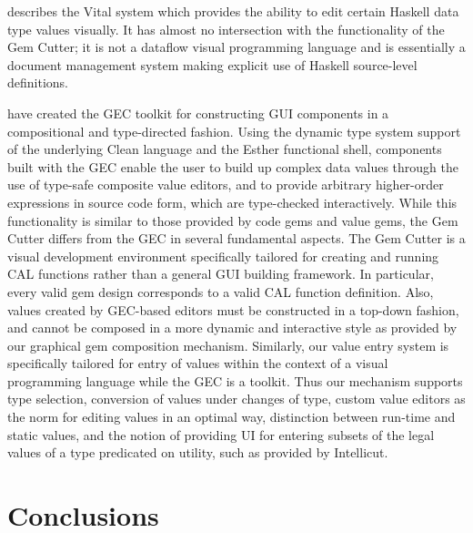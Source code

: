 \documentclass[preprint]{sigplanconf}
\begin{document}
\citet{hanna02} describes the Vital system which provides the ability to edit certain
Haskell data type values visually. It has almost no intersection with
the functionality of the Gem Cutter; it is not a dataflow visual
programming language and is essentially a document management system making
explicit use of Haskell source-level definitions.

\citet{achten-afp04} have
created the GEC toolkit for constructing GUI components in a
compositional and type-directed fashion. Using the dynamic type system
support of the underlying Clean language and the Esther functional
shell, components built with the GEC enable the user to build up
complex data values through the use of type-safe composite value
editors, and to provide arbitrary higher-order expressions in source
code form, which are type-checked interactively. While this
functionality is similar to those provided by code gems and value
gems, the Gem Cutter differs from the GEC in several fundamental
aspects. The Gem Cutter is a visual development environment specifically
tailored for creating and running CAL functions rather than a general GUI building
framework. In particular, every valid gem design corresponds to a valid CAL function
definition. Also, values created by GEC-based editors must be constructed in a top-down
fashion, and cannot be composed in a more dynamic and interactive
style as provided by our graphical gem composition mechanism. 
Similarly, our value entry system is specifically tailored for entry of values
within the context of a visual programming language while the GEC is
a toolkit. Thus our mechanism supports type selection, conversion of values under
changes of type, custom value editors as the norm for editing values
in an optimal way, distinction between run-time and static values,
and the notion of providing UI for entering subsets of the legal values
of a type predicated on utility, such as provided by Intellicut.


\section{Conclusions}
\label{sec:conc}
\end{document}
